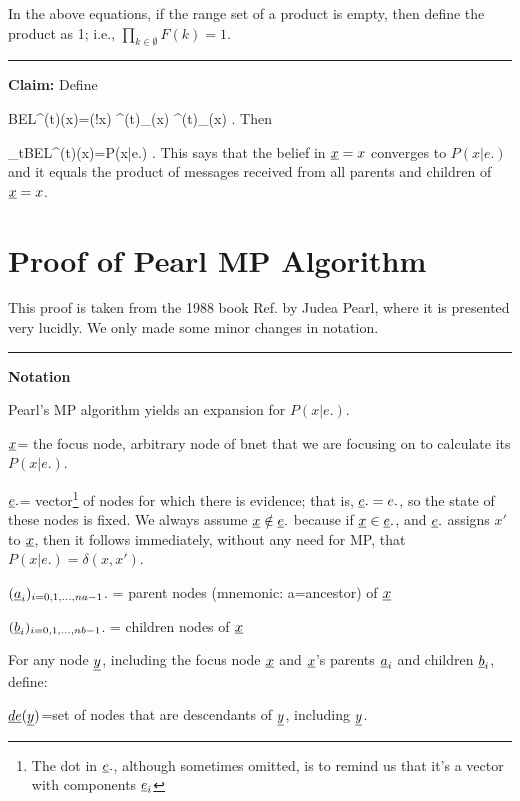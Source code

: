 In the above
equations, if the
range set of a product is empty, then
 define the product as 1; i.e., 
$\prod_{k\in \emptyset}F(k)=1$.


\hrule\noindent
{\bf Claim:} Define

\beq
BEL^{(t)}(x)=\caln(!x)
\lam^{(t)}_\rvx(x)
\pi^{(t)}_\rvx(x)
\;.\eeq
Then

\beq
\lim_{t\rarrow \infty}BEL^{(t)}(x)=P(x|e.)
\;.
\eeq
This  says that
the belief in ${\underline{x}}=x$
converges to $P(x|e.)$ and it
equals the product 
of messages received from all
parents and children of ${\underline{x}}=x$.

\section*{Proof of Pearl MP Algorithm}

This proof is taken from
 the 1988 book Ref.\cite{pearl-1988book}
by Judea Pearl, where it
is presented very lucidly. We only
made some minor
changes in notation.

\hrule\noindent
 {\bf Notation}

Pearl's MP algorithm yields an expansion
 for $P(x|e.)$.

${\underline{x}}$= the focus node, 
arbitrary node of bnet that we are 
focusing on to calculate its $P(x|e.)$.

${\underline{e}}.$= vector\footnote{The dot
in ${\underline{e}}.$, although
sometimes omitted,  is
to remind us that it's a vector 
with components 
${\underline{e}}_i$} of nodes for which
 there is evidence; that is,
${\underline{e}}.=e.$, so 
the state of these nodes is fixed.
We always assume ${\underline{x}}\notin {\underline{e}}.$
because if ${\underline{x}}\in {\underline{e}}.$, 
and ${\underline{e}}.$ assigns $x'$ to ${\underline{x}}$,
then it follows immediately, without 
any need for MP, that
$P(x|e.)=\delta(x,x')$.



$({\underline{a}}_i)_{i=0,1, \ldots, na-1}$. = parent nodes
 (mnemonic: a=ancestor) of ${\underline{x}}$

$({\underline{b}}_i)_{i=0,1, \ldots, nb-1}$. = 
children nodes of ${\underline{x}}$

For any node ${\underline{y}}$, including 
the focus node ${\underline{x}}$ and 
${\underline{x}}$'s parents ${\underline{a}}_i$ and children ${\underline{b}}_i$,
define:

$\underline{de}({\underline{y}})$=set of
nodes that are descendants of ${\underline{y}}$,
including ${\underline{y}}$.

